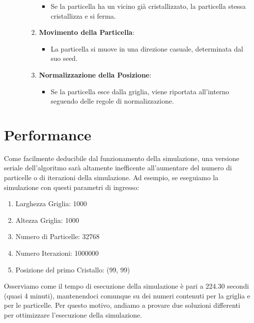 \documentclass{article}
\begin{document}
\begin{enumerate}
\begin{itemize}
\begin{enumerate}
\begin{itemize}
                        \item Se la particella ha un vicino già cristallizzato, la particella stessa cristallizza e si ferma.
                    \end{itemize}
                \item \textbf{Movimento della Particella}:
                    \begin{itemize}
                        \item La particella si muove in una direzione casuale, determinata dal suo seed.
                    \end{itemize}
                \item \textbf{Normalizzazione della Posizione}:
                    \begin{itemize}
                        \item Se la particella esce dalla griglia, viene riportata all'interno seguendo delle regole di normalizzazione.
                    \end{itemize}
            \end{enumerate}
    \end{itemize}
\end{enumerate}

\section{Performance}
Come facilmente deducibile dal funzionamento della simulazione, una versione seriale dell'algoritmo sarà altamente inefficente all'aumentare del numero di particelle o di iterazioni della simulazione.
Ad esempio, se eseguiamo la simulazione con questi parametri di ingresso:
\begin{enumerate}
    \item Larghezza Griglia: 1000
    \item Altezza Griglia: 1000
    \item Numero di Particelle: 32768
    \item Numero Iterazioni: 1000000
    \item Posizione del primo Cristallo: (99, 99) 
\end{enumerate}
Osserviamo come il tempo di esecuzione della simulazione è pari a 224.30 secondi (quasi 4 minuti), mantenendoci comunque su dei numeri contenuti per la griglia e per le particelle.
Per questo motivo, andiamo a provare due soluzioni differenti per ottimizzare l'esecuzione della simulazione.
\end{document}
